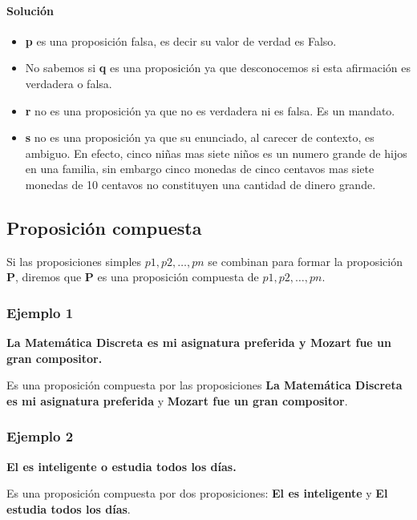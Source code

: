 \documentclass[a4paper,11pt,oneside,titlepage,final]{scrartc}
\begin{document}
\paragraph{Solución}

\begin{itemize}
\item \textbf{p} es una proposición falsa, es decir su valor de verdad es Falso.
\item No sabemos si \textbf{q} es una proposición ya que desconocemos si esta afirmación es verdadera o falsa.
\item \textbf{r} no es una proposición ya que no es verdadera ni es falsa. Es un mandato.
\item \textbf{s} no es una proposición ya que su enunciado, al carecer de contexto, es ambiguo. En efecto, cinco niñas mas siete niños es un numero grande de hijos en una familia, sin embargo cinco monedas de cinco centavos mas siete monedas de 10 centavos no constituyen una cantidad de dinero grande.
\end{itemize}


\subsection{Proposición compuesta}

Si las proposiciones simples $p1, p2, \ldots, pn$ se combinan para formar la proposición \textbf{P}, diremos que \textbf{P} es una proposición compuesta de $p1, p2, \ldots, pn$.

\subsubsection*{Ejemplo 1}
\begin{center}
\textbf{La Matemática Discreta es mi asignatura preferida y Mozart fue un gran compositor.}
\end{center}

Es una proposición compuesta por las proposiciones \textbf{La Matemática Discreta es mi asignatura preferida} y \textbf{Mozart fue un gran compositor}.

\subsubsection*{Ejemplo 2}
\begin{center}
\textbf{El es inteligente o estudia todos los días.}
\end{center}

Es una proposición compuesta por dos proposiciones: \textbf{El es inteligente} y \textbf{El estudia todos los días}.
\end{document}
